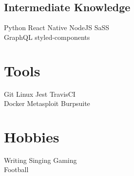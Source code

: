 \documentclass[]{deedy-resume-openfont}
\begin{document}
\begin{minipage}[t]{0.36\textwidth}
\subsection{Intermediate Knowledge}
Python \textbullet{} React Native \textbullet{} NodeJS \textbullet{} SaSS\\
GraphQL \textbullet{} styled-components


\section{Tools}
Git \textbullet{} Linux \textbullet{}  Jest \textbullet{} TravisCI \\
Docker \textbullet{}  Metasploit \textbullet{} Burpsuite 


\section{Hobbies}
Writing \textbullet{} Singing \textbullet{} Gaming \\
Football





%
%

\end{minipage} 
\hfill
\end{document}
